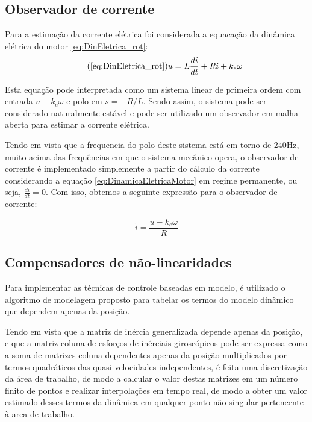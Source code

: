 \documentclass[]{politex}
\begin{document}
\subsection{Observador de corrente}

Para a estimação da corrente elétrica foi considerada a equacação da dinâmica elétrica do motor \eqref{eq:DinEletrica_rot}:
\begin{equation}
\tag{\ref{eq:DinEletrica_rot}} \label{eq:DinamicaEletricaMotor}
	   u = L \frac{di}{dt} + R i + k_{e} \omega
\end{equation}

Esta equação pode interpretada como um sistema linear de primeira ordem com entrada $u - k_{e} \omega $ e polo em $s = -R/L$. Sendo assim, o sistema pode ser considerado naturalmente estável e pode ser utilizado um observador em malha aberta para estimar a corrente elétrica.

Tendo em vista que a frequencia do polo deste sistema está em torno de 240Hz, muito acima das frequências em que o sistema mecânico opera, o observador de corrente é implementado simplemente a partir do cálculo da corrente considerando a equação \eqref{eq:DinamicaEletricaMotor} em regime permanente, ou seja, $\frac{di}{dt} = 0$. Com isso, obtemos a seguinte expressão para o observador de corrente:

\begin{equation}
\label{corrente}
\hat{i} = \frac{u - k_e \omega}{R}
\end{equation}

\subsection{Compensadores de não-linearidades}

Para implementar as técnicas de controle baseadas em modelo, é utilizado o algoritmo de modelagem proposto para tabelar os termos do modelo dinâmico que dependem apenas da posição.

Tendo em vista que a matriz de inércia generalizada depende apenas da posição, e que a matriz-coluna de esforços de inérciais giroscópicos pode ser expressa como a soma de matrizes coluna dependentes apenas da posição multiplicados por termos quadráticos das quasi-velocidades independentes, é feita uma discretização da área de trabalho, de modo a calcular o valor destas matrizes em um número finito de pontos e realizar interpolações em tempo real, de modo a obter um valor estimado desses termos da dinâmica em qualquer ponto não singular pertencente à area de trabalho.
\end{document}
